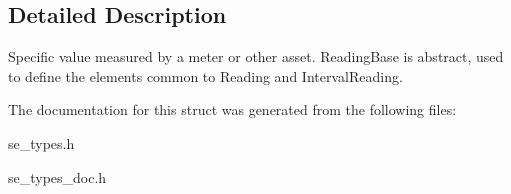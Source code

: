 \subsection{Detailed Description}
Specific value measured by a meter or other asset. Reading\+Base is abstract, used to define the elements common to Reading and Interval\+Reading. 

The documentation for this struct was generated from the following files\+:\begin{DoxyCompactItemize}
\item 
se\+\_\+types.\+h\item 
se\+\_\+types\+\_\+doc.\+h\end{DoxyCompactItemize}
